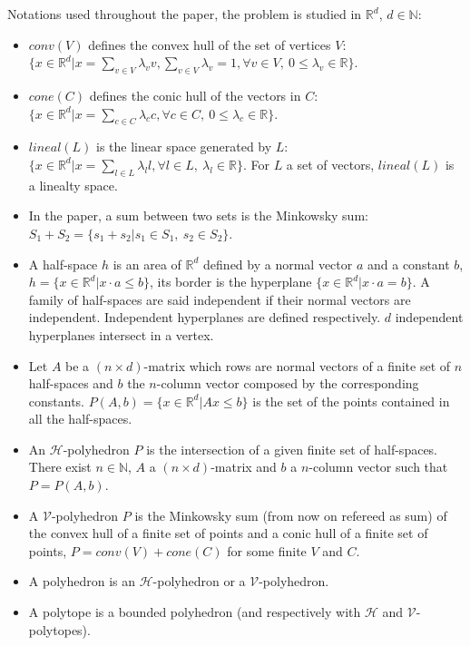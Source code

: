 Notations used throughout the paper, the problem is studied in $\mathbb{R}^d$, $d\in \mathbb{N}$:
\begin{itemize}
	\item $conv(V)$ defines the convex hull of the set of vertices $V$: $\{ x\in\mathbb{R}^d| x=\sum_{v\in V} \lambda_v v, \sum_{v\in V} \lambda_v =1, \forall v \in V, \ 0\leq \lambda_v \in \mathbb{R} \}$.
	\item $cone(C)$ defines the conic hull of the vectors in $C$: $\{ x\in\mathbb{R}^d| x=\sum_{c\in C} \lambda_c c, \forall c \in C,\ 0\leq \lambda_c \in \mathbb{R} \}$.
	\item $lineal(L)$ is the linear space generated by $L$: $\{ x\in\mathbb{R}^d| x=\sum_{l\in L} \lambda_l l, \forall l \in L,\ \lambda_l \in \mathbb{R} \}$. For $L$ a set of vectors, $lineal(L)$ is a linealty space. 
	\item In the paper, a sum between two sets is the Minkowsky sum: $S_1+S_2=\{s_1+s_2|s_1\in S_1,\ s_2 \in S_2 \}$.
	\item A half-space $h$ is an area of $\mathbb{R}^d$ defined by a normal vector $a$ and a constant $b$, $h=\{x\in\mathbb{R}^d|x\cdot a\leq b\}$, its border is the hyperplane $\{x\in\mathbb{R}^d|x\cdot a = b\}$. A family of half-spaces are said independent if their normal vectors are independent. Independent hyperplanes are defined respectively. $d$ independent hyperplanes intersect in a vertex.
	\item Let $A$ be a $(n\times d)$-matrix which rows are normal vectors of a finite set of $n$ half-spaces and $b$ the $n$-column vector composed by the corresponding constants. $P(A,b)=\{x\in\mathbb{R}^d|Ax\leq b\}$ is the set of the points contained in all the half-spaces.
	\item An $\mathcal{H}$-polyhedron $P$ is the intersection of a given finite set of half-spaces. There exist $n\in \mathbb{N}$, $A$ a $(n\times d)$-matrix and $b$ a $n$-column vector such that $P=P(A,b)$.
	\item A $\mathcal{V}$-polyhedron $P$ is the Minkowsky sum (from now on refereed as sum) of the convex hull of a finite set of points and a conic hull of a finite set of points, $P=conv(V)+cone(C)$ for some finite $V$ and $C$.
	\item A polyhedron is an $\mathcal{H}$-polyhedron or a $\mathcal{V}$-polyhedron.
	\item A polytope is a bounded polyhedron (and respectively with $\mathcal{H}$ and $\mathcal{V}$-polytopes).
\end{itemize}
 

